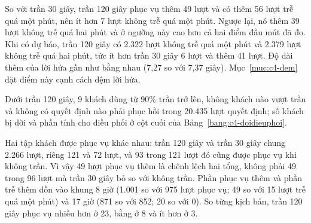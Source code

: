 So với trần 30 giây, trần 120 giây phục vụ thêm 49 lượt và có thêm 56 lượt trễ quá một phút, nên ít hơn 7
lượt không trễ quá một phút. Ngược lại, nó thêm 39 lượt không trễ quá hai phút và ở ngưỡng này cao hơn cả
hai điểm đầu mút đã đo. Khi có dự báo, trần 120 giây có 2.322 lượt không trễ quá một phút và 2.379 lượt
không trễ quá hai phút, tức ít hơn trần 30 giây 6 lượt và thêm 41 lượt. Độ dài thêm của lời hứa gần như
bằng nhau (7,27 so với 7,37 giây). Mục~\ref{muc:c4-dem} đặt điểm này cạnh cách đệm lời hứa.

Dưới trần 120 giây, 9 khách dùng từ 90\% trần trở lên, không khách nào vượt trần và không có quyết định
nào phải phục hồi trong 20.435 lượt quyết định; số khách bị dời và phần tính cho điều phối ở cột cuối của
Bảng~\ref{bang:c4-doidieuphoi}.

Hai tập khách được phục vụ khác nhau: trần 120 giây và trần 30 giây chung 2.266 lượt, riêng 121 và 72
lượt, và 93 trong 121 lượt đó cũng được phục vụ khi không trần. Vì vậy 49 lượt phục vụ thêm là chênh lệch
hai tổng, không phải 49 trong 96 lượt mà trần 30 giây bỏ so với không trần. Phần phục vụ thêm và phần trễ
thêm dồn vào khung 8 giờ (1.001 so với 975 lượt phục vụ; 49 so với 15 lượt trễ quá một phút) và 17 giờ
(871 so với 852; 20 so với 0). So từng kịch bản, trần 120 giây phục vụ nhiều hơn ở 23, bằng ở 8 và ít
hơn ở 3.

